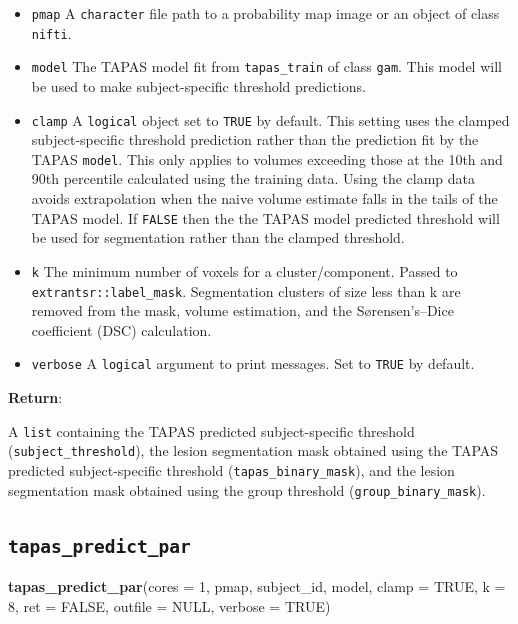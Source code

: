 \documentclass[]{article}
\newenvironment{Shaded}{\begin{snugshade}}{\end{snugshade}}
\newcommand{\DataTypeTok}[1]{\textcolor[rgb]{0.13,0.29,0.53}{#1}}
\newcommand{\DecValTok}[1]{\textcolor[rgb]{0.00,0.00,0.81}{#1}}
\newcommand{\KeywordTok}[1]{\textcolor[rgb]{0.13,0.29,0.53}{\textbf{#1}}}
\newcommand{\NormalTok}[1]{#1}
\newcommand{\OtherTok}[1]{\textcolor[rgb]{0.56,0.35,0.01}{#1}}
\providecommand{\tightlist}{%
  \setlength{\itemsep}{0pt}\setlength{\parskip}{0pt}}
\begin{document}
\begin{itemize}
\tightlist
\item
  \texttt{pmap} A \texttt{character} file path to a probability map
  image or an object of class \texttt{nifti}.
\item
  \texttt{model} The TAPAS model fit from \texttt{tapas\_train} of class
  \texttt{gam}. This model will be used to make subject-specific
  threshold predictions.
\item
  \texttt{clamp} A \texttt{logical} object set to \texttt{TRUE} by
  default. This setting uses the clamped subject-specific threshold
  prediction rather than the prediction fit by the TAPAS \texttt{model}.
  This only applies to volumes exceeding those at the 10th and 90th
  percentile calculated using the training data. Using the clamp data
  avoids extrapolation when the naive volume estimate falls in the tails
  of the TAPAS model. If \texttt{FALSE} then the the TAPAS model
  predicted threshold will be used for segmentation rather than the
  clamped threshold.
\item
  \texttt{k} The minimum number of voxels for a cluster/component.
  Passed to \texttt{extrantsr::label\_mask}. Segmentation clusters of
  size less than k are removed from the mask, volume estimation, and the
  Sørensen's--Dice coefficient (DSC) calculation.
\item
  \texttt{verbose} A \texttt{logical} argument to print messages. Set to
  \texttt{TRUE} by default.
\end{itemize}

\textbf{Return}:

A \texttt{list} containing the TAPAS predicted subject-specific
threshold (\texttt{subject\_threshold}), the lesion segmentation mask
obtained using the TAPAS predicted subject-specific threshold
(\texttt{tapas\_binary\_mask}), and the lesion segmentation mask
obtained using the group threshold (\texttt{group\_binary\_mask}).

\hypertarget{tapas_predict_par}{%
\subsection{\texorpdfstring{\texttt{tapas\_predict\_par}}{tapas\_predict\_par}}\label{tapas_predict_par}}

\begin{Shaded}
\begin{Highlighting}[]
\KeywordTok{tapas_predict_par}\NormalTok{(}\DataTypeTok{cores =} \DecValTok{1}\NormalTok{,}
\NormalTok{                  pmap,}
\NormalTok{                  subject_id,}
\NormalTok{                  model,}
                  \DataTypeTok{clamp =} \OtherTok{TRUE}\NormalTok{,}
                  \DataTypeTok{k =} \DecValTok{8}\NormalTok{,}
                  \DataTypeTok{ret =} \OtherTok{FALSE}\NormalTok{,}
                  \DataTypeTok{outfile =} \OtherTok{NULL}\NormalTok{,}
                  \DataTypeTok{verbose =} \OtherTok{TRUE}\NormalTok{)}
\end{Highlighting}
\end{Shaded}
\end{document}
